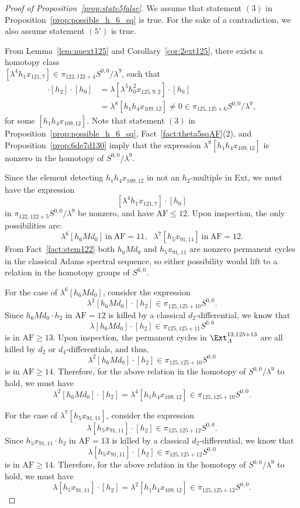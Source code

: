 \documentclass{amsart}
\numberwithin{equation}{section}
\newcommand{\AF}{\mathrm{AF}}
\begin{document}
\begin{proof}[Proof of Proposition~\ref{prop:state5false}]
    We assume that statement $(3)$ in Proposition~\ref{prop:possible_h_6_sq} is true. For the sake of a contradiction, we also assume statement $(5')$ is true.

    From Lemma~\ref{lem:nuext125} and Corollary~\ref{cor:2ext125}, there exists a homotopy class\\ $[\lambda^4 h_1 x_{121,7}] \in \pi_{122,122+4}S^{0,0}/\lambda^9$, such that
\begin{align*}
    [\lambda^4 h_1 x_{121,7}] \cdot [h_2] \cdot [h_0] & = \lambda [\lambda^5 h_0^2 x_{125,9,2}] \cdot [h_0] \\
    & = \lambda^8 [h_1h_4x_{109,12}] \neq 0 \in \pi_{125,125+6} S^{0,0}/\lambda^9,
\end{align*} 
    for some $[h_1h_4x_{109,12}]$. Note that statement $(3)$ in Proposition~\ref{prop:possible_h_6_sq}, Fact~\ref{fact:theta5sqAF}(2), and Proposition~\ref{prop:6de7d130} imply that the expression  $\lambda^8 [h_1h_4x_{109,12}]$ is nonzero in the homotopy of $S^{0,0}/\lambda^9$.

Since the element detecting $h_1h_4x_{109,12}$ in not an $h_2$-multiple in Ext, we must have the expression
$$[\lambda^4 h_1 x_{121,7}] \cdot [h_0]$$
in $\pi_{122,122+5} S^{0,0}/\lambda^9$ be nonzero, and have $\AF \le 12$. Upon inspection, the only possibilities are:
$$\lambda^6 [h_6 M d_0] \ \text{in} \ \AF=11,  \ \ \ \lambda^7 [h_5x_{91,11}] \ \text{in} \ \AF=12.$$
From Fact~\ref{fact:stem122} both $h_6 M d_0$ and $h_5x_{91,11}$ are nonzero permanent cycles in the classical Adams spectral sequence, so either possibility would lift to a relation in the homotopy groups of $S^{0,0}$.

For the case of $\lambda^6 [h_6 M d_0]$, consider the expression
$$\lambda^2 [h_6 M d_0] \cdot [h_2] \in \pi_{125, 125+10}S^{0,0}.$$
Since $h_6 M d_0 \cdot h_2$ in $\AF=12$ is killed by a classical $d_2$-differential, we know that 
$$\lambda [h_6 M d_0] \cdot [h_2] \in \pi_{125, 125+11}S^{0,0}$$ 
is in $\AF \ge 13$. Upon inspection, the permanent cycles in $\Ext_A^{13, 125+13}$ are all killed by $d_2$ or $d_4$-differentials, and thus, $$\lambda^2 [h_6 M d_0] \cdot [h_2] \in \pi_{125, 125+10}S^{0,0}$$ 
is in $\AF \ge 14$. Therefore, for the above relation in the homotopy of $S^{0,0}/\lambda^9$ to hold, we must have 
$$\lambda^2 [h_6 M d_0] \cdot [h_2] = \lambda^4 [h_1h_4x_{109,12}] \in \pi_{125, 125+10} S^{0,0}.$$

For the case of $\lambda^7 [h_5x_{91,11}]$, consider the expression
$$\lambda [h_5x_{91,11}] \cdot [h_2] \in \pi_{125, 125+12}S^{0,0}.$$
Since $h_5x_{91,11} \cdot h_2$ in $\AF=13$ is killed by a classical $d_2$-differential, we know that
$$\lambda [h_5x_{91,11}] \cdot [h_2] \in \pi_{125, 125+12}S^{0,0}$$
is in $\AF \ge 14$.
Therefore, for the above relation in the homotopy of $S^{0,0}/\lambda^9$ to hold, we must have
$$\lambda [h_5x_{91,11}] \cdot [h_2] = \lambda^2 [h_1h_4x_{109,12}] \in \pi_{125, 125+12}S^{0,0}.$$


\end{proof}
\end{document}
